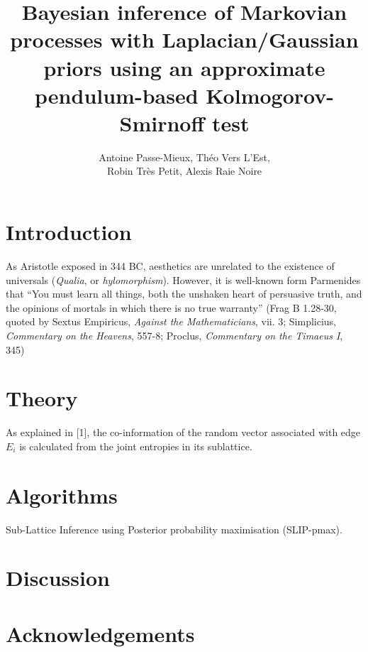 \documentclass[a4paper]{article}
\author{Antoine Passe-Mieux, Théo Vers L'Est,\\  Robin Très Petit, Alexis Raie Noire}
\title{Bayesian inference of Markovian processes with Laplacian/Gaussian priors
using an approximate pendulum-based Kolmogorov-Smirnoff test}
\begin{document}
\maketitle

\section{Introduction}
As Aristotle exposed in 344 BC, aesthetics are unrelated to the existence of
universals (\emph{Qualia}, or \emph{hylomorphism}).
However, it is well-known form Parmenides that “You must learn all things, both the unshaken heart of persuasive truth, and the opinions of mortals in which there is no true warranty” (Frag B 1.28-30, quoted by Sextus Empiricus, \emph{Against the Mathematicians}, vii. 3; Simplicius, \emph{Commentary on the Heavens}, 557-8; Proclus, \emph{Commentary on the Timaeus I}, 345)

\section{Theory}
As explained in [1], the co-information of the random vector associated with
edge $E_i$ is calculated from the joint entropies in its sublattice.

\section{Algorithms}
Sub-Lattice Inference using Posterior probability maximisation (SLIP-pmax).

\section{Discussion}

\section{Acknowledgements}
\end{document}
